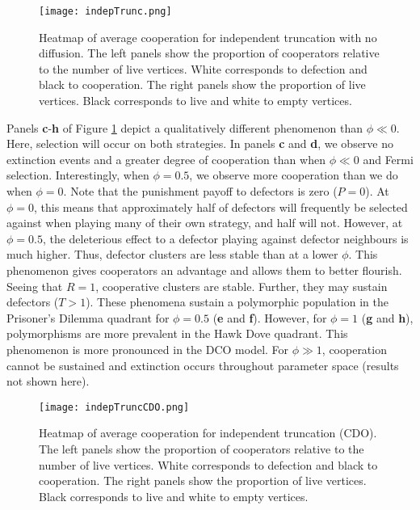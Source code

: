 \documentclass[reprint,aps,pre,twocolumn]{revtex4-1}
\begin{document}
\begin{figure}
\texttt{[image: indepTrunc.png]}
\caption{Heatmap of average cooperation for independent truncation with no diffusion.  The left panels show the proportion of cooperators relative to the number of live vertices. White corresponds to defection and black to cooperation. The right panels show the proportion of live vertices. Black corresponds to live and white to empty vertices.}
\label{indepTrunc}
\end{figure}

Panels \textbf{c}-\textbf{h} of Figure \ref{indepTrunc} depict a qualitatively different phenomenon than $\phi \ll 0$. Here, selection will occur on both strategies. In panels \textbf{c} and \textbf{d}, we observe no extinction events and a greater degree of cooperation than when $\phi \ll 0$ and Fermi selection. %
Interestingly, when $\phi = 0.5$, we observe more cooperation than we do when $\phi = 0$. Note that the punishment payoff to defectors is zero ($P = 0$). At $\phi = 0$, this means that approximately half of defectors will frequently be selected against when playing many of their own strategy, and half will not. However, at $\phi = 0.5$, the deleterious effect to a defector playing against defector neighbours is much higher. Thus, defector clusters are less stable than at a lower $\phi$. This phenomenon gives cooperators an advantage and allows them to better flourish. Seeing that $R = 1$, cooperative clusters are stable. Further, they may sustain defectors ($T > 1$). These phenomena sustain a polymorphic population in the Prisoner's Dilemma quadrant for $\phi = 0.5$ (\textbf{e} and \textbf{f}). However, for $\phi = 1$ (\textbf{g} and \textbf{h}), polymorphisms are more prevalent in the Hawk Dove quadrant. This phenomenon is more pronounced in the DCO model. %
For $\phi \gg 1$, cooperation cannot be sustained and extinction occurs throughout parameter space (results not shown here).

\begin{figure}
\texttt{[image: indepTruncCDO.png]}
\caption{Heatmap of average cooperation for independent truncation (CDO).  The left panels show the proportion of cooperators relative to the number of live vertices. White corresponds to defection and black to cooperation. The right panels show the proportion of live vertices. Black corresponds to live and white to empty vertices.}
\label{indepTruncCDO}
\end{figure}
\end{document}
